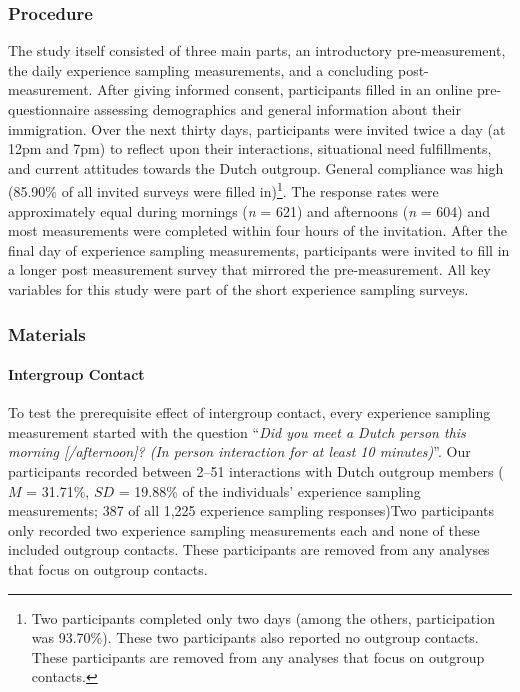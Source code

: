 \subsubsection{Procedure}

The study itself consisted of three main parts, an introductory
pre-measurement, the daily experience sampling measurements, and a
concluding post-measurement. After giving informed consent, participants
filled in an online pre-questionnaire assessing demographics and general
information about their immigration. Over the next thirty days,
participants were invited twice a day (at 12pm and 7pm) to reflect upon
their interactions, situational need fulfillments, and current attitudes
towards the Dutch outgroup. General compliance was high (85.90\% of all
invited surveys were filled
in)\footnote{Two participants completed only two days (among the others, participation was 93.70\%). These two participants also reported no outgroup contacts. These participants are removed from any analyses that focus on outgroup contacts.}.
The response rates were approximately equal during mornings (\textit{n}
= 621) and afternoons (\textit{n} = 604) and most measurements were
completed within four hours of the invitation. After the final day of
experience sampling measurements, participants were invited to fill in a
longer post measurement survey that mirrored the pre-measurement. All
key variables for this study were part of the short experience sampling
surveys.

\subsubsection{Materials}

\paragraph{Intergroup Contact}

To test the prerequisite effect of intergroup contact, every experience
sampling measurement started with the question
``\textit{Did you meet a Dutch person this morning [/afternoon]? (In person interaction for at least 10 minutes)}''.
Our participants recorded between 2--51 interactions with Dutch outgroup
members (\(M\) = 31.71\%, \(SD\) = 19.88\% of the individuals'
experience sampling measurements; 387 of all 1,225 experience sampling
responses)Two participants only recorded two experience sampling
measurements each and none of these included outgroup contacts. These
participants are removed from any analyses that focus on outgroup
contacts.

